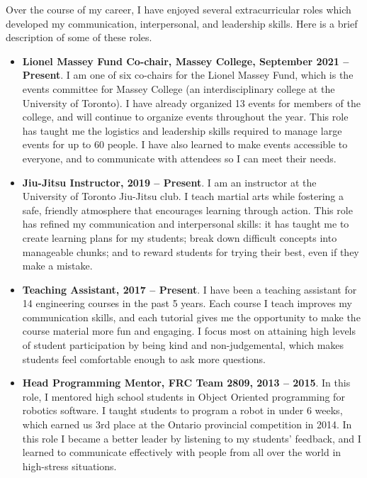 \documentclass[letterpaper,12pt]{article}
\begin{document}
Over the course of my career, I have enjoyed several extracurricular
roles which developed my communication, interpersonal, and leadership skills.
Here is a brief description of some of these roles.
\begin{itemize}
\item \textbf{Lionel Massey Fund Co-chair, Massey College, September 2021 -- Present}.
    I am one of six co-chairs for the Lionel Massey Fund, which is the events
    committee for Massey College (an interdisciplinary college at the University
    of Toronto).
    I have already organized 13 events for members of the college, and will
    continue to organize events throughout the year.
    This role has taught me the logistics and leadership skills required to
    manage large events for up to 60 people.
    I have also learned to make events accessible to everyone, and to
    communicate with attendees so I can meet their needs.

\item \textbf{Jiu-Jitsu Instructor, 2019 -- Present}. 
    I am an instructor at the University of Toronto Jiu-Jitsu club. I teach
    martial arts while fostering a safe, friendly atmosphere that
    encourages learning through action.
    This role has refined my communication and interpersonal skills:
    it has taught me to create learning plans for my students;
    break down difficult concepts into manageable chunks; 
    and to reward students for trying their best, even if they make a mistake.

\item \textbf{Teaching Assistant, 2017 -- Present}.
    I have been a teaching assistant for 14 engineering courses in the past 5 years.
    Each course I teach improves my communication skills, and each tutorial gives
    me the opportunity to make the course material more fun and engaging.
    I focus most on attaining high levels of student participation by being
    kind and non-judgemental, which makes students feel
    comfortable enough to ask more questions.


\item \textbf{Head Programming Mentor, FRC Team 2809, 2013 -- 2015}. 
    In this role, I mentored high school students in Object Oriented programming
    for robotics software. I taught students to program a robot in under 6
    weeks, which earned us 3rd place at the Ontario provincial competition in
    2014.
    In this role I became a better leader by listening to my students' feedback,
    and I learned to communicate effectively with people from all over the world
    in high-stress situations.

\end{itemize}
\end{document}
